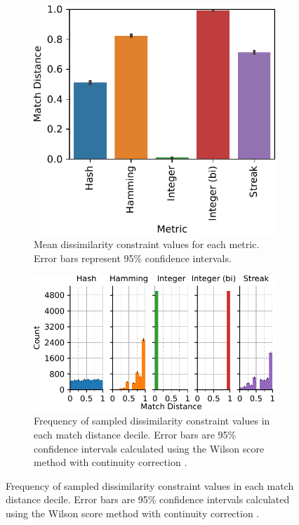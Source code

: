 \begin{figure}
\begin{center}
\begin{subfigure}[b]{\linewidth}
\begin{minipage}{0.6\linewidth}
\includegraphics[width=\linewidth]{img/sphere_reverse/bitweight=0dot5+seed=1+title=dimensionality_barplot+_data_hathash_hash=93f97a11cb443d35+_script_fullcat_hash=a3db428966bb187a+ext=}
\end{minipage}
\begin{minipage}{0.35\linewidth}
\caption{
Mean dissimilarity constraint values for each metric.
Error bars represent 95\% confidence intervals.
}
\label{fig:sphere_reverse_distnplot}
\end{minipage}
\end{subfigure}
\begin{subfigure}[b]{\columnwidth}
\centering
\includegraphics[width=\columnwidth]{img/sphere_reverse/bitweight=0dot5+seed=1+title=dimensionality_distnplot+viz=hist+_data_hathash_hash=93f97a11cb443d35+_script_fullcat_hash=cda229fb13f5a152+ext=}
\caption{
Frequency of sampled dissimilarity constraint values in each match distance decile.
Error bars are 95\% confidence intervals calculated using the Wilson score method with continuity correction \citep{newcombe1998two}.
}
\label{fig:sphere_reverse_barplot}
\end{subfigure}


\end{center}
\end{figure}
